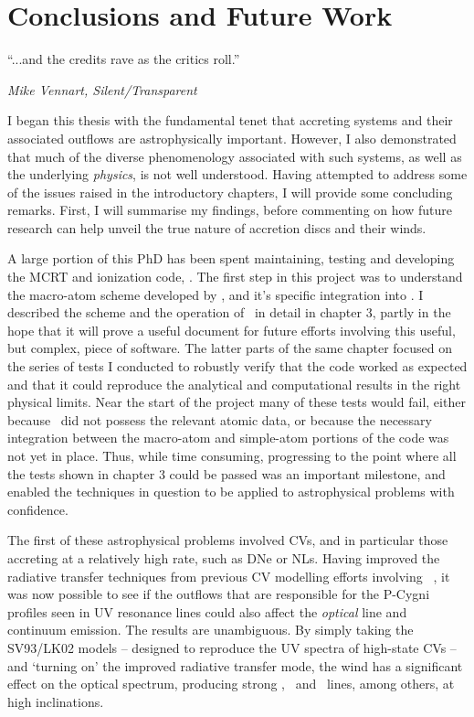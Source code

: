 \chapter{Conclusions and Future Work}

\epigraph{``...and the credits rave as the critics roll.''}
{{\sl Mike Vennart, Silent/Transparent}}

I began this thesis with the fundamental tenet that accreting systems
and their associated outflows are astrophysically important. However, I also
demonstrated that much of the diverse phenomenology associated with such systems, as well
as the underlying {\em physics}, is not well understood.  
Having attempted to address some of the issues raised in the 
introductory chapters, I will provide some concluding remarks. 
First, I will summarise my findings, before 
commenting on how future research can help unveil the true nature of 
accretion discs and their winds.

A large portion of this PhD has been spent maintaining,
testing and developing the MCRT and ionization code, \py. The first 
step in this project was to understand the macro-atom scheme
developed by \cite{lucy2002,lucy2003}, and it's specific integration
into \py. I described the scheme and the operation of \py\ in detail
in chapter 3, partly in the hope that it will prove a useful document
for future efforts involving this useful, but complex, piece of software.
The latter parts of the same chapter focused on the series of tests
I conducted to robustly verify that the code worked as expected and that 
it could reproduce the analytical and computational results in the 
right physical limits. Near the start of the project many of these tests
would fail, either because \py\ did not possess the relevant atomic data,
or because the necessary integration between the macro-atom and simple-atom
portions of the code was not yet in place. Thus, while time consuming,
progressing to the point where all the tests shown in chapter 3 could be
passed was an important milestone, and enabled the techniques in question
to be applied to astrophysical problems with confidence.

The first of these astrophysical problems involved CVs, and in particular
those accreting at a relatively high rate, such as DNe or NLs. Having 
improved the radiative transfer techniques from previous CV modelling efforts
involving \py\ \citep[LK02, ][]{noebauer}, it was now possible to see
if the outflows that are responsible for the P-Cygni profiles seen
in UV resonance lines could also affect the {\em optical} line and continuum
emission. The results are unambiguous. By simply taking the SV93/LK02
models -- designed to reproduce the UV spectra of high-state CVs --
and `turning on' the improved radiative transfer mode, the wind
has a significant effect on the optical spectrum, producing strong
\ha, \heiiopt\ and \heiioptnew\ lines, among others, at high inclinations.

